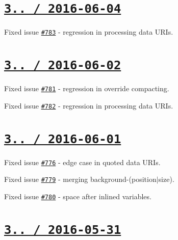 \section*{\href{https://github.com/jakubpawlowicz/clean-css/compare/v3.4.16...v3.4.17}{\tt 3.. / 2016-\/06-\/04} }


\begin{DoxyItemize}
\item Fixed issue \href{https://github.com/jakubpawlowicz/clean-css/issues/783}{\tt \#783} -\/ regression in processing data U\+R\+Is.
\end{DoxyItemize}

\section*{\href{https://github.com/jakubpawlowicz/clean-css/compare/v3.4.15...v3.4.16}{\tt 3.. / 2016-\/06-\/02} }


\begin{DoxyItemize}
\item Fixed issue \href{https://github.com/jakubpawlowicz/clean-css/issues/781}{\tt \#781} -\/ regression in override compacting.
\item Fixed issue \href{https://github.com/jakubpawlowicz/clean-css/issues/782}{\tt \#782} -\/ regression in processing data U\+R\+Is.
\end{DoxyItemize}

\section*{\href{https://github.com/jakubpawlowicz/clean-css/compare/v3.4.14...v3.4.15}{\tt 3.. / 2016-\/06-\/01} }


\begin{DoxyItemize}
\item Fixed issue \href{https://github.com/jakubpawlowicz/clean-css/issues/776}{\tt \#776} -\/ edge case in quoted data U\+R\+Is.
\item Fixed issue \href{https://github.com/jakubpawlowicz/clean-css/issues/779}{\tt \#779} -\/ merging {\ttfamily background-\/(position$\vert$size)}.
\item Fixed issue \href{https://github.com/jakubpawlowicz/clean-css/issues/780}{\tt \#780} -\/ space after inlined variables.
\end{DoxyItemize}

\section*{\href{https://github.com/jakubpawlowicz/clean-css/compare/v3.4.13...v3.4.14}{\tt 3.. / 2016-\/05-\/31} }


